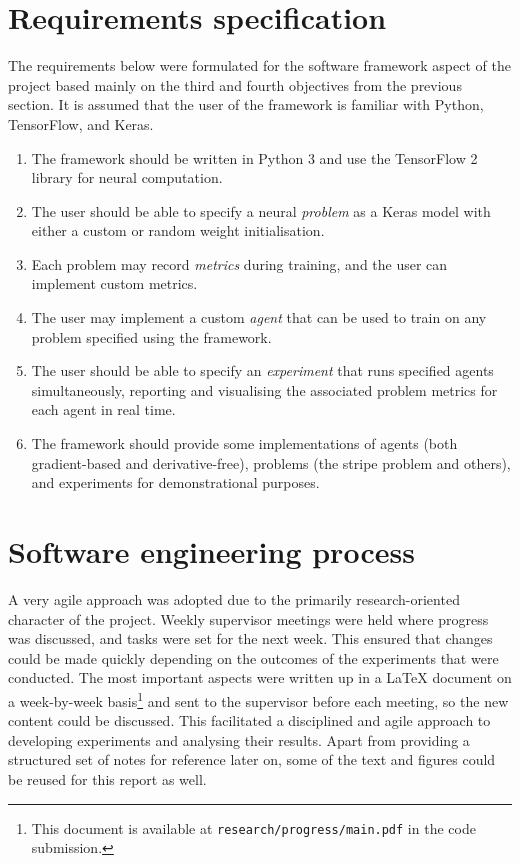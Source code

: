 \section{Requirements specification}
\label{sec:requirements}
The requirements below were formulated for the software framework aspect of the project based mainly on the third and fourth objectives from the previous section.
It is assumed that the user of the framework is familiar with Python, TensorFlow, and Keras.
\begin{enumerate}
    \item The framework should be written in Python 3 and use the TensorFlow 2 library for neural computation.
    \item The user should be able to specify a neural \textit{problem} as a Keras model with either a custom or random weight initialisation.
    \item Each problem may record \textit{metrics} during training, and the user can implement custom metrics.
    \item The user may implement a custom \textit{agent} that can be used to train on any problem specified using the framework.
    \item The user should be able to specify an \textit{experiment} that runs specified agents simultaneously, reporting and visualising the associated problem metrics for each agent in real time. 
    \item The framework should provide some implementations of agents (both gradient-based and derivative-free), problems (the stripe problem and others), and experiments for demonstrational purposes.
\end{enumerate}

\section{Software engineering process}
A very agile approach was adopted due to the primarily research-oriented character of the project.
Weekly supervisor meetings were held where progress was discussed, and tasks were set for the next week.
This ensured that changes could be made quickly depending on the outcomes of the experiments that were conducted.
The most important aspects were written up in a \LaTeX{} document on a week-by-week basis\footnote{This document is available at \texttt{research/progress/main.pdf} in the code submission.} and sent to the supervisor before each meeting, so the new content could be discussed.
This facilitated a disciplined and agile approach to developing experiments and analysing their results.
Apart from providing a structured set of notes for reference later on, some of the text and figures could be reused for this report as well.

